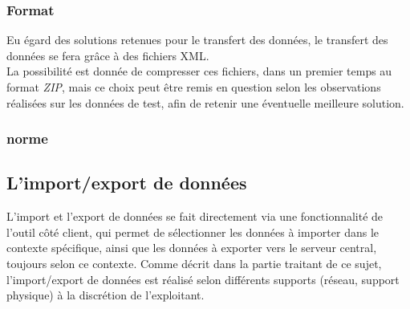 \subsubsection{Format}
Eu égard des solutions retenues pour le transfert des données, le transfert des données se fera grâce à des fichiers XML. \\
La possibilité est donnée de compresser ces fichiers, dans un premier temps au format \emph{ZIP}, mais ce choix peut être remis en question selon les observations réalisées sur les données de test, afin de retenir une éventuelle meilleure solution.

\subsubsection{norme}
% 
% 

\subsection{L'import/export de données}
L'import et l'export de données se fait directement via une fonctionnalité de l'outil côté client, qui permet de sélectionner les données à importer dans le contexte spécifique, ainsi que les données à exporter vers le serveur central, toujours selon ce contexte.
Comme décrit dans la partie traitant de ce sujet, l'import/export de données est réalisé selon différents supports (réseau, support physique) à la discrétion de l'exploitant.
